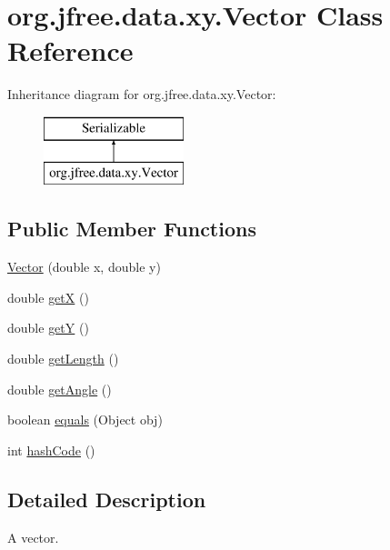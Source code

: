 \hypertarget{classorg_1_1jfree_1_1data_1_1xy_1_1_vector}{}\section{org.\+jfree.\+data.\+xy.\+Vector Class Reference}
\label{classorg_1_1jfree_1_1data_1_1xy_1_1_vector}
Inheritance diagram for org.\+jfree.\+data.\+xy.\+Vector\+:\begin{figure}[H]
\begin{center}
\leavevmode
\includegraphics[height=2.000000cm]{classorg_1_1jfree_1_1data_1_1xy_1_1_vector}
\end{center}
\end{figure}
\subsection*{Public Member Functions}
\begin{DoxyCompactItemize}
\item 
\mbox{\hyperlink{classorg_1_1jfree_1_1data_1_1xy_1_1_vector_a65a8d9b25351cbdf1f45e53699d87dfe}{Vector}} (double x, double y)
\item 
double \mbox{\hyperlink{classorg_1_1jfree_1_1data_1_1xy_1_1_vector_a07b9fb02180a1fe7c5a676974b443102}{getX}} ()
\item 
double \mbox{\hyperlink{classorg_1_1jfree_1_1data_1_1xy_1_1_vector_a3eedb42b5e205ea7e1c65186ea376446}{getY}} ()
\item 
double \mbox{\hyperlink{classorg_1_1jfree_1_1data_1_1xy_1_1_vector_ad61c905b160f07d9deed0b16f221f532}{get\+Length}} ()
\item 
double \mbox{\hyperlink{classorg_1_1jfree_1_1data_1_1xy_1_1_vector_a08b5f748248c932e8256d04908dc5ea3}{get\+Angle}} ()
\item 
boolean \mbox{\hyperlink{classorg_1_1jfree_1_1data_1_1xy_1_1_vector_a6adc315128df854154ebc8c20e94cd9c}{equals}} (Object obj)
\item 
int \mbox{\hyperlink{classorg_1_1jfree_1_1data_1_1xy_1_1_vector_a14f5ca529b38c757fda3788b62fd0aa5}{hash\+Code}} ()
\end{DoxyCompactItemize}


\subsection{Detailed Description}
A vector.

